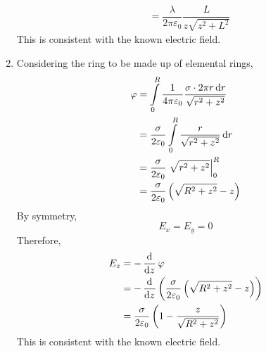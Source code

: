 \documentclass[fleqn, a4paper, 12pt, oneside]{amsart}
\theoremstyle{definition}
\theoremstyle{theorem}
\begin{document}
\begin{solution}
\begin{enumerate}
\begin{align*}
				&= \dfrac{\lambda}{2 \pi \varepsilon_0} \dfrac{L}{z \sqrt{z^2 + L^2}}
			\end{align*}
			This is consistent with the known electric field.
		\item
			Considering the ring to be made up of elemental rings,
			\begin{align*}
				\varphi &= \int\limits_{0}^{R} \dfrac{1}{4 \pi \varepsilon_0} \dfrac{\sigma \cdot 2 \pi r \dif r}{\sqrt{r^2 + z^2}}\\
				&= \dfrac{\sigma}{2 \varepsilon_0} \int\limits_{0}^{R} \dfrac{r}{\sqrt{r^2 + z^2}} \dif r\\
				&= \dfrac{\sigma}{2 \varepsilon_0} \left. \sqrt{r^2 + z^2} \right|_{0}^{R}\\
				&= \dfrac{\sigma}{2 \varepsilon_0} \left( \sqrt{R^2 + z^2} - z \right)
			\end{align*}
			By symmetry,
			\begin{equation*}
				E_x = E_y = 0
			\end{equation*}
			Therefore,
			\begin{align*}
				E_z &= -\dod{}{z} \varphi\\
				&= -\dod{}{z} \left( \dfrac{\sigma}{2 \varepsilon_0} \left( \sqrt{R^2 + z^2} - z \right) \right)\\
				&= \dfrac{\sigma}{2 \varepsilon_0} \left( 1 - \dfrac{z}{\sqrt{R^2 + z^2}} \right)
			\end{align*}
			This is consistent with the known electric field.
	\end{enumerate}
\end{solution}
\end{document}
